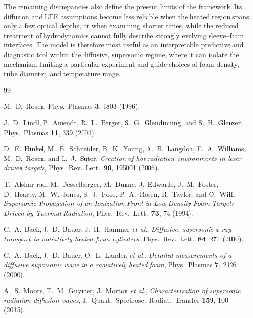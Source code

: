 \documentclass[prl, twocolumn, superscriptaddress, amsmath, amssymb, reprint]{revtex4-2}
\begin{document}
The remaining discrepancies also define the present limits of the framework. Its diffusion and LTE assumptions become less reliable when the heated region spans only a few optical depths, or when examining shorter times, while the reduced treatment of hydrodynamics cannot fully describe strongly evolving sleeve--foam interfaces. The model is therefore most useful as an interpretable predictive and diagnostic tool within the diffusive, supersonic regime, where it can isolate the mechanism limiting a particular experiment and guide choices of foam density, tube diameter, and temperature range.
\endgroup

\begin{thebibliography}{99}

M.~D.~Rosen,
Phys.\ Plasmas \textbf{3}, 1803 (1996).

J.~D.~Lindl, P.~Amendt, R.~L.~Berger, S.~G.~Glendinning, and S.~H.~Glenzer,
Phys.\ Plasmas \textbf{11}, 339 (2004).

D.~E.~Hinkel, M.~B.~Schneider, B.~K.~Young, A.~B.~Langdon, E.~A.~Williams, M.~D.~Rosen, and L.~J.~Suter,
\textit{Creation of hot radiation environments in laser-driven targets},
Phys.\ Rev.\ Lett.\ \textbf{96}, 195001 (2006).

T.~Afshar-rad, M.~Desselberger, M.~Dunne, J.~Edwards, J.~M.~Foster, D.~Hoarty,
M.~W.~Jones, S.~J.~Rose, P.~A.~Rosen, R.~Taylor, and O.~Willi,
\textit{Supersonic Propagation of an Ionization Front in Low Density Foam Targets Driven by Thermal Radiation},
Phys.\ Rev.\ Lett.\ \textbf{73}, 74 (1994).

C.~A.~Back, J.~D.~Bauer, J.~H.~Hammer \textit{et al.},
\textit{Diffusive, supersonic x-ray transport in radiatively heated foam cylinders},
Phys.\ Rev.\ Lett.\ \textbf{84}, 274 (2000).

C.~A.~Back, J.~D.~Bauer, O.~L.~Landen \textit{et al.},
\textit{Detailed measurements of a diffusive supersonic wave in a radiatively heated foam},
Phys.\ Plasmas \textbf{7}, 2126 (2000).

A.~S.~Moore, T.~M.~Guymer, J.~Morton \textit{et al.},
\textit{Characterization of supersonic radiation diffusion waves},
J.\ Quant.\ Spectrosc.\ Radiat.\ Transfer \textbf{159}, 100 (2015).


\end{thebibliography}
\end{document}
